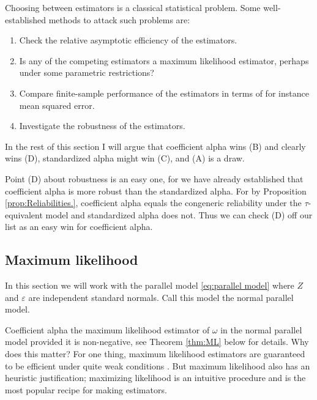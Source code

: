 \documentclass[twoside]{article}
\DeclareMathOperator{\Cor}{Cor}
\renewcommand{\sqrt}[1]{{(#1)^{1/2}}}
\begin{document}
Choosing between estimators is a classical statistical problem. Some well-established methods to attack such problems are:


\begin{enumerate}[label=(\Alph*)]
\item Check the relative asymptotic efficiency of the estimators.
\item Is any of the competing estimators a maximum likelihood estimator, perhaps under some parametric restrictions?
\item Compare finite-sample performance of the estimators in terms of for instance mean squared error.
\item Investigate the robustness of the estimators.
\end{enumerate}

In the rest of this section I will argue that coefficient alpha wins (B) and clearly wins (D), standardized alpha might win (C), and (A) is a draw.  

Point (D) about robustness is an easy one, for we have already established that coefficient alpha is more robust than the standardized alpha. For by Proposition \ref{prop:Reliabilities.}, coefficient alpha equals the congeneric reliability under the $\tau$-equivalent model and standardized alpha does not. Thus we can check (D) off our list as an easy win for coefficient alpha.

\subsection{Maximum likelihood}
In this section we will work with the parallel model \eqref{eq:parallel model} where $Z$ and $\varepsilon$ are independent standard normals. Call this model the normal parallel model.

Coefficient alpha the maximum likelihood estimator of $\omega$ in the normal parallel model provided it is non-negative, see Theorem \ref{thm:ML} below for details. Why does this matter? For one thing, maximum likelihood estimators are guaranteed to be efficient under quite weak conditions \citep[][Section 7.3]{Lehmann2004-ke}. But maximum likelihood also has an heuristic justification; maximizing likelihood is an intuitive procedure and is the most popular recipe for making estimators.
\end{document}
